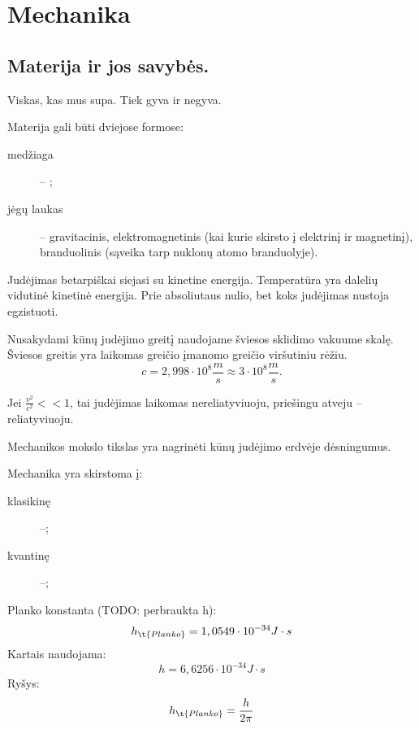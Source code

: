\chapter{Mechanika}

\section{Materija ir jos savybės.}

\begin{defn}[Materija]
  Viskas, kas mus supa. Tiek gyva ir negyva.
\end{defn}

Materija gali būti dviejose formose:
\begin{description}
  \item[medžiaga] – ;
  \item[jėgų laukas] – gravitacinis, elektromagnetinis (kai kurie skirsto
    į elektrinį ir magnetinį), branduolinis (sąveika tarp nuklonų
    atomo branduolyje).
\end{description}

Judėjimas betarpiškai siejasi su kinetine energija. Temperatūra yra
dalelių vidutinė kinetinė energija. Prie absoliutaus nulio, bet koks
judėjimas nustoja egzistuoti.

Nusakydami kūnų judėjimo greitį naudojame šviesos sklidimo vakuume skalę.
Šviesos greitis yra laikomas greičio įmanomo greičio viršutiniu 
rėžiu.
\begin{equation*}
  c = 2,998 \cdot 10^{8} \frac{m}{s} \approx 3 \cdot 10 ^{8} \frac{m}{s}.
\end{equation*}

Jei $\frac{v^{2}}{c^{2}} << 1$, tai judėjimas laikomas nereliatyviuoju,
priešingu atveju – reliatyviuoju.

Mechanikos mokslo tikslas yra nagrinėti kūnų judėjimo erdvėje
dėsningumus.

Mechanika yra skirstoma į:
\begin{description}
  \item[klasikinę] –;
  \item[kvantinę] –;
\end{description}

Planko konstanta (TODO: perbraukta h):
\begin{equation*}
  h_{\t{Planko}} = 1,0549 \cdot 10 ^{-34} J \cdot s
\end{equation*}
Kartais naudojama:
\begin{equation*}
  h = 6,6256 \cdot 10 ^{-34} J \cdot s
\end{equation*}
Ryšys:
\begin{equation*}
  h_{\t{Planko}} = \frac{h}{2 \pi}
\end{equation*}


